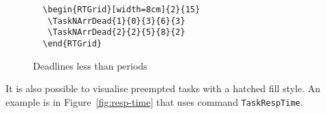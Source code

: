\documentclass{article}
\begin{document}
\begin{figure}[!htbp]
  \centering
  \begin{RTGrid}[width=8cm]{2}{15}
  \end{RTGrid}
\begin{verbatim}
  \begin{RTGrid}[width=8cm]{2}{15}
   \TaskNArrDead{1}{0}{3}{6}{3}
   \TaskNArrDead{2}{2}{5}{8}{2}
  \end{RTGrid}
\end{verbatim}
  \caption{Deadlines less than periods}
  \label{fig:ex1c}
\end{figure}

It is also possible to visualise preempted tasks with a hatched fill
style. An example is in Figure~\ref{fig:resp-time} that uses command
\texttt{TaskRespTime}. 
\end{document}
